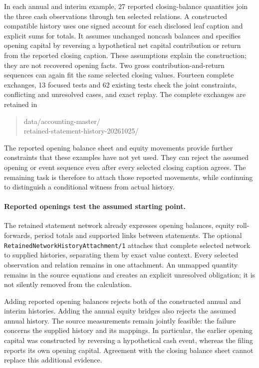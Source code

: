 In each annual and interim example, 27 reported closing-balance quantities
join the three cash observations through ten selected relations. A
constructed compatible history uses one signed account for each disclosed
leaf caption and explicit sums for totals. It assumes unchanged noncash
balances and specifies opening capital by reversing a hypothetical net
capital contribution or return from the reported closing caption. These
assumptions explain the construction; they are not recovered opening facts.
Two gross contribution-and-return sequences can again fit the same selected
closing values. Fourteen complete exchanges, 13 focused tests and 62 existing
tests check the joint constraints, conflicting and unresolved cases, and
exact replay. The complete exchanges are retained in
\begin{quote}\small\ttfamily
data/accounting-master/\\
retained-statement-history-20261025/
\end{quote}
The reported opening balance sheet and equity movements provide further
constraints that these examples have not yet used. They can reject the
assumed opening or event sequence even after every selected closing caption
agrees. The remaining task is therefore to attach those reported movements,
while continuing to distinguish a conditional witness from actual history.


\paragraph{Reported openings test the assumed starting point.}
The retained statement network already expresses opening balances, equity
roll-forwards, period totals and supported links between statements. The
optional \texttt{RetainedNetworkHistoryAttachment/1} attaches that complete
selected network to supplied histories, separating them by exact value
context. Every selected observation and relation remains in one attachment.
An unmapped quantity remains in the source equations and creates an explicit
unresolved obligation; it is not silently removed from the calculation.

Adding reported opening balances rejects both of the constructed annual and
interim histories. Adding the annual equity bridges also rejects the assumed
annual history. The source measurements remain jointly feasible: the failure
concerns the supplied history and its mappings. In particular, the earlier
opening capital was constructed by reversing a hypothetical cash event,
whereas the filing reports its own opening capital. Agreement with the closing
balance sheet cannot replace this additional evidence.

